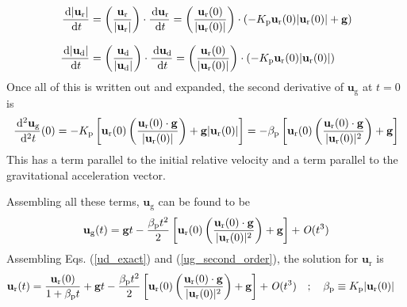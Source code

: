 \begin{align}
    \frac{\,\mathrm{d} |\mathbf{u}_\text{r}|}{\,\mathrm{d} t} &= \left(\frac{\mathbf{u}_\text{r}}{|\mathbf{u}_\text{r}|}\right) \cdot \frac{\,\mathrm{d} \mathbf{u}_\text{r}}{\,\mathrm{d} t} = \left(\frac{\mathbf{u}_{\text{r}}(0)}{|\mathbf{u}_{\text{r}}(0)|}\right) \cdot (-K_{\rm p} \mathbf{u}_{\text{r}}(0) |\mathbf{u}_{\text{r}}(0)| + \mathbf{g})  \\[.1in]
    \frac{\,\mathrm{d} |\mathbf{u}_\text{d}|}{\,\mathrm{d} t} &= \left(\frac{\mathbf{u}_\text{d}}{|\mathbf{u}_\text{d}|}\right) \cdot \frac{\,\mathrm{d} \mathbf{u}_\text{d}}{\,\mathrm{d} t} = \left(\frac{\mathbf{u}_{\text{r}}(0)}{|\mathbf{u}_{\text{r}}(0)|}\right) \cdot (-K_{\rm p} \mathbf{u}_{\text{r}}(0) |\mathbf{u}_{\text{r}}(0)|)
\end{align}
Once all of this is written out and expanded, the second derivative of $\mathbf{u}_\text{g}$ at $t = 0$ is
\begin{align}
    \frac{\,\mathrm{d}^2 \mathbf{u}_\text{g}}{\,\mathrm{d}^2 t}(0) = -K_{\rm p} \left[\mathbf{u}_{\text{r}}(0) \left(\frac{\mathbf{u}_{\text{r}}(0) \cdot \mathbf{g}}{|\mathbf{u}_{\text{r}}(0)|}\right) + \mathbf{g} |\mathbf{u}_{\text{r}}(0)|\right] = - \beta_{\rm p} \left[\mathbf{u}_{\text{r}}(0) \left(\frac{\mathbf{u}_{\text{r}}(0) \cdot \mathbf{g}}{|\mathbf{u}_{\text{r}}(0)|^2}\right) + \mathbf{g}\right]
\end{align}
This has a term parallel to the initial relative velocity and a term parallel to the gravitational acceleration vector.

Assembling all these terms, $\mathbf{u}_\text{g}$ can be found to be
\begin{align}
    \label{ug_second_order}
    \mathbf{u}_\text{g}(t) = \mathbf{g} t - \frac{\beta_{\rm p} t^2}{2} \left[\mathbf{u}_{\text{r}}(0) \left(\frac{\mathbf{u}_{\text{r}}(0) \cdot \mathbf{g}}{|\mathbf{u}_{\text{r}}(0)|^2}\right) + \mathbf{g}\right] + \mathit{O}(t^3)
\end{align}
Assembling Eqs. (\ref{ud_exact}) and (\ref{ug_second_order}), the solution for $\mathbf{u}_\text{r}$ is
\begin{align}
    \label{ur_short}
    \mathbf{u}_\text{r}(t) &= \frac{\mathbf{u}_{\text{r}}(0)}{1 + \beta_{\rm p} t} + \mathbf{g} t - \frac{\beta_{\rm p} t^2}{2} \left[\mathbf{u}_{\text{r}}(0) \left(\frac{\mathbf{u}_{\text{r}}(0) \cdot \mathbf{g}}{|\mathbf{u}_{\text{r}}(0)|^2}\right) + \mathbf{g}\right] + \mathit{O}(t^3) \quad ; \quad \beta_{\rm p} \equiv K_{\rm p} |\mathbf{u}_{\text{r}}(0)| %
\end{align}

